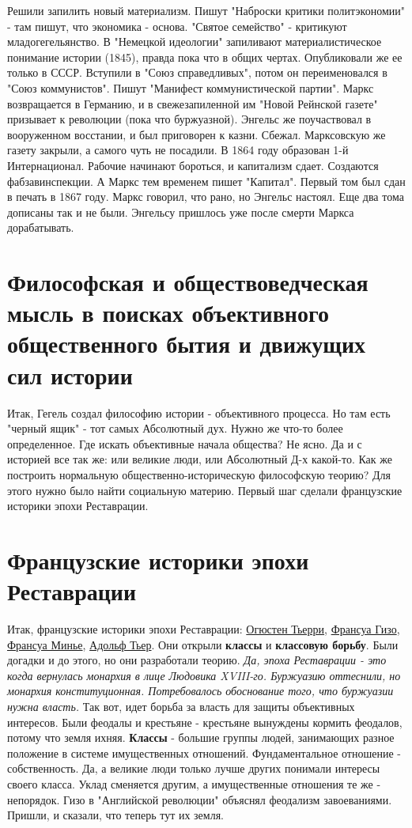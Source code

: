 Решили запилить новый материализм. Пишут "Наброски критики политэкономии" - там пишут, что экономика - основа. "Святое семейство" - критикуют младогегельянство. В "Немецкой идеологии" запиливают материалистическое понимание истории (1845), правда пока что в общих чертах. Опубликовали же ее только в СССР. Вступили в "Союз справедливых", потом он переименовался в "Союз коммунистов". Пишут "Манифест коммунистической партии". Маркс возвращается в Германию, и в свежезапиленной им "Новой Рейнской газете" призывает к революции (пока что буржуазной). Энгельс же поучаствовал в вооруженном восстании, и был приговорен к казни. Сбежал. Марксовскую же газету закрыли, а самого чуть не посадили. В 1864  году образован 1-й Интернационал. Рабочие начинают бороться, и капитализм сдает. Создаются фабзавинспекции. А Маркс тем временем пишет "Капитал". Первый том был сдан в печать в 1867 году. Маркс говорил, что рано, но Энгельс настоял. Еще два тома дописаны так и не были. Энгельсу пришлось уже после смерти Маркса дорабатывать.

\section{Философская и обществоведческая мысль в поисках объективного общественного бытия и движущих сил истории}
Итак, Гегель создал философию истории - объективного процесса. Но там есть "черный ящик" - тот самых Абсолютный дух. Нужно же что-то более определенное.  Где искать объективные начала общества? Не ясно. Да и с историей все так же: или великие люди, или Абсолютный Д-х какой-то. Как же построить нормальную общественно-историческую философскую теорию? Для этого нужно было найти социальную материю. Первый шаг сделали французские историки эпохи Реставрации.

\section{Французские историки эпохи Реставрации}
 Итак, французские историки эпохи Реставрации: \underline{Огюстен Тьерри}, \underline{Франсуа Гизо}, \underline{Франсуа Минье}, \underline{Адольф Тьер}. Они открыли \textbf{классы} и \textbf{ классовую борьбу}. Были догадки и до этого, но они разработали теорию. \textit{Да, эпоха Реставрации - это когда вернулась монархия в лице Людовика XVIII-го. Буржуазию оттеснили, но монархия конституционная. Потребовалось обоснование того, что буржуазии нужна власть.} Так вот, идет борьба за власть для защиты объективных интересов. Были феодалы и крестьяне - крестьяне вынуждены кормить феодалов, потому что земля ихняя. \textbf{Классы} - большие группы людей, занимающих разное положение в системе имущественных отношений. Фундаментальное отношение - собственность. Да, а великие люди только лучше других понимали интересы своего класса. Уклад сменяется другим, а имущественные отношения те же - непорядок. Гизо в "Английской революции" объяснял феодализм завоеваниями. Пришли, и сказали, что теперь тут их земля.


